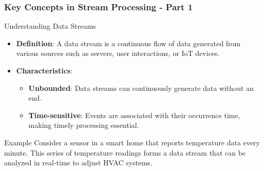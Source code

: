 \documentclass[aspectratio=169]{beamer}
\begin{document}
\begin{frame}[fragile]
    \frametitle{Key Concepts in Stream Processing - Part 1}
    \begin{block}{Understanding Data Streams}
        \begin{itemize}
            \item \textbf{Definition}: A data stream is a continuous flow of data generated from various sources such as servers, user interactions, or IoT devices.
            \item \textbf{Characteristics}:
            \begin{itemize}
                \item \textbf{Unbounded}: Data streams can continuously generate data without an end.
                \item \textbf{Time-sensitive}: Events are associated with their occurrence time, making timely processing essential.
            \end{itemize}
        \end{itemize}
    \end{block}
    
    \begin{block}{Example}
        Consider a sensor in a smart home that reports temperature data every minute. This series of temperature readings forms a data stream that can be analyzed in real-time to adjust HVAC systems.
    \end{block}
\end{frame}
\end{document}
